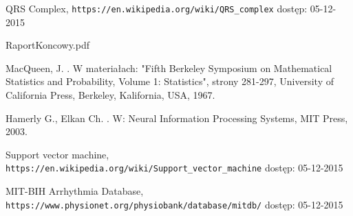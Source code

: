 
\begin{thebibliography}{99} %

 
QRS Complex,
\newblock \texttt{https://en.wikipedia.org/wiki/QRS\_complex}
\newblock dostęp: 05-12-2015

RaportKoncowy.pdf

MacQueen, J.
.
\newblock W materiałach: "Fifth Berkeley Symposium on Mathematical Statistics and Probability, Volume 1: Statistics", strony 281-297,
\newblock University of California Press, Berkeley, Kalifornia, USA, 1967. 

Hamerly G., Elkan Ch.
.
\newblock W: Neural Information Processing Systems,
\newblock MIT Press, 2003.

Support vector machine,
\newblock \texttt{https://en.wikipedia.org/wiki/Support\_vector\_machine}
\newblock dostęp: 05-12-2015

MIT-BIH Arrhythmia Database,
\newblock \texttt{https://www.physionet.org/physiobank/database/mitdb/}
\newblock dostęp: 05-12-2015



\end{thebibliography}